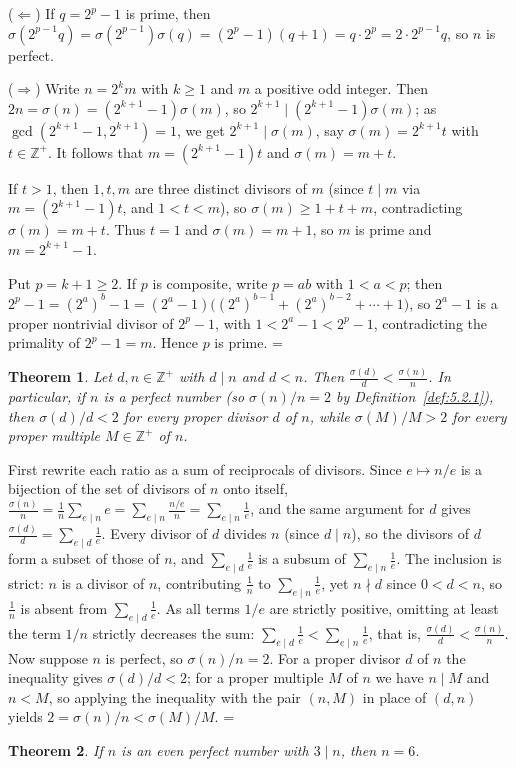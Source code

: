 \documentclass[11pt]{article}
\makeatletter
\theoremstyle{ntstyle}
\newtheorem{theorem}{Theorem}[subsection]
\let\nt@closedisplay\]
\def\nt@guardedclose{\@ifnextchar\par{\nt@closeafterpar}{\@ifnextchar\end{\postdisplaypenalty\@M\nt@closedisplay}{\nt@closedisplay}}}
\def\nt@closeafterpar\par{\@ifnextchar\par{\nt@closeafterpar}{\@ifnextchar\end{\postdisplaypenalty\@M\nt@closedisplay\par}{\nt@closedisplay\par}}}
\renewenvironment{proof}[1][\proofname]{\par
  \pushQED{\qed}\normalfont\topsep\medskipamount\edef\nt@afterproof{\@endparpenalty=\the\@endparpenalty\relax}\@beginparpenalty\@M\@endparpenalty\@M\let\]\nt@guardedclose\trivlist\item[]\textit{#1\@addpunct{.}} \ignorespaces}{\ifvmode\addpenalty\@M\fi\popQED\nt@afterproof\endtrivlist\@endpefalse}
\makeatother
\begin{document}
\begin{proof} ($\Leftarrow$) If $q = 2^p-1$ is prime,
	then $\sigma(2^{p-1}q) = \sigma(2^{p-1})\sigma(q) = (2^p-1)(q+1) =
		q\cdot 2^p = 2\cdot 2^{p-1}q$, so $n$ is perfect.

	($\Rightarrow$) Write $n=2^km$ with $k\ge1$ and $m$ a positive odd integer. Then $2n = \sigma(n) =
		(2^{k+1}-1)\sigma(m)$, so $2^{k+1}\mid (2^{k+1}-1)\sigma(m)$; as
	$\gcd(2^{k+1}-1, 2^{k+1})=1$, we get $2^{k+1}\mid\sigma(m)$, say
	$\sigma(m)=2^{k+1}t$ with $t\in\mathbb{Z}^+$. It follows that
	$m=(2^{k+1}-1)t$ and $\sigma(m)=m+t$.

	If $t>1$,
	then $1, t, m$ are three distinct divisors of $m$ (since $t\mid m$
	via $m=(2^{k+1}-1)t$, and $1<t<m$), so $\sigma(m)\ge 1+t+m$,
	contradicting $\sigma(m)=m+t$. Thus $t=1$ and $\sigma(m) = m+1$, so $m$
	is prime and $m=2^{k+1}-1$.

	Put $p=k+1\ge2$. If $p$ is composite, write $p =
		ab$ with $1 < a < p$; then $2^{p}-1 = (2^{a})^{b} - 1 =
			(2^{a}-1)\big((2^{a})^{b-1} + (2^{a})^{b-2} + \cdots + 1\big)$, so
	$2^{a}-1$ is a proper nontrivial divisor of $2^{p}-1$, with $1 < 2^{a}-1 < 2^{p}-1$, contradicting
	the primality of $2^{p}-1 = m$.
	Hence $p$ is prime.
\end{proof}
\begin{theorem}\label{thm:5.2.2} Let $d,n\in\mathbb{Z}^+$ with $d\mid n$ and
	$d<n$. Then
	$\tfrac{\sigma(d)}{d}<\tfrac{\sigma(n)}{n}$. In particular, if $n$ is
	a perfect number (so $\sigma(n)/n=2$ by Definition~\ref{def:5.2.1}), then
	$\sigma(d)/d<2$ for every proper divisor $d$ of $n$, while
	$\sigma(M)/M>2$ for every proper multiple $M\in\mathbb{Z}^+$ of $n$.
\end{theorem}

\begin{proof} First rewrite each ratio as a sum of
	reciprocals of divisors. Since $e\mapsto n/e$ is a bijection of the
	set of divisors of $n$ onto itself,
	$\tfrac{\sigma(n)}{n}=\tfrac{1}{n}\sum_{e\mid n}e=\sum_{e\mid
			n}\tfrac{n/e}{n}=\sum_{e\mid n}\tfrac{1}{e}$, and the same argument
	for $d$ gives $\tfrac{\sigma(d)}{d}=\sum_{e\mid d}\tfrac{1}{e}$.
	Every divisor of $d$ divides $n$ (since $d\mid n$), so
	the divisors of $d$ form a subset of those of $n$, and
	$\sum_{e\mid d}\tfrac{1}{e}$ is a subsum of
	$\sum_{e\mid n}\tfrac{1}{e}$. The inclusion is strict: $n$
	is a divisor of $n$, contributing $\tfrac{1}{n}$ to $\sum_{e\mid
			n}\tfrac{1}{e}$, yet $n\nmid d$ since $0<d<n$, so $\tfrac{1}{n}$ is absent
	from $\sum_{e\mid d}\tfrac{1}{e}$. As all terms $1/e$ are strictly
	positive, omitting at least the term $1/n$ strictly decreases the
	sum: $\sum_{e\mid d}\tfrac{1}{e}<\sum_{e\mid n}\tfrac{1}{e}$, that is,
	$\tfrac{\sigma(d)}{d}<\tfrac{\sigma(n)}{n}$. Now suppose $n$ is
	perfect, so $\sigma(n)/n=2$. For a proper divisor $d$ of $n$ the
	inequality gives $\sigma(d)/d<2$; for a proper multiple $M$ of $n$ we
	have $n\mid M$ and $n<M$, so applying the inequality with the pair
	$(n,M)$ in place of $(d,n)$ yields $2=\sigma(n)/n<\sigma(M)/M$.
\end{proof}
\begin{theorem}\label{thm:5.2.3} If $n$ is an even perfect number with $3\mid
		n$, then $n=6$.
\end{theorem}
\end{document}
